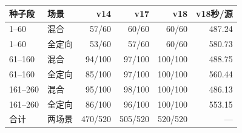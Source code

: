 \begin{tabular}{llrrrr}\toprule
种子段&场景&v14&v17&v18&v18秒/源\\\midrule
1--60&混合&57/60&60/60&60/60&487.24\\
1--60&全定向&53/60&57/60&60/60&580.73\\
61--160&混合&94/100&97/100&100/100&488.75\\
61--160&全定向&85/100&97/100&100/100&560.44\\
161--260&混合&95/100&98/100&100/100&486.13\\
161--260&全定向&86/100&96/100&100/100&553.15\\
合计&两场景&470/520&505/520&520/520&---\\
\bottomrule\end{tabular}